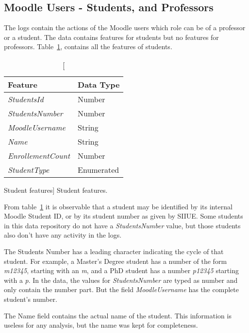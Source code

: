 \subsection{Moodle Users - Students, and Professors}
\label{ref:moodle_users}

The logs contain the actions of the Moodle users which role can be of a
professor or a student. The data contains features for students but no
features for professors. Table~\ref{tab:students_features}, contains all the
features of students.

\begin{table}[h!]
    \centering

    \begin{tabular}{l l}
        Feature                   & Data Type  \\ \hline
        \textit{StudentsId}       & Number     \\
        \textit{StudentsNumber}   & Number     \\
        \textit{MoodleUsername}   & String     \\
        \textit{Name}             & String     \\
        \textit{EnrollementCount} & Number     \\
        \textit{StudentType}      & Enumerated \\
    \end{tabular}

    \caption
        [Student features]
        {Student features.}

    \label{tab:students_features}
\end{table}

From table~\ref{tab:students_features} it is observable that a student may be
identified by its internal Moodle Student ID, or by its student number as
given by SIIUE. Some students in this data repository do not have a
\textit{StudentsNumber} value, but those students also don't have any activity
in the logs.

The Students Number has a leading character indicating the cycle of that
student. For example, a Master's Degree student has a number of the form
\textit{m12345}, starting with an \textit{m}, and a PhD student has a number
\textit{p12345} starting with a \textit{p}. In the data, the values for
\textit{StudentsNumber} are typed as number and only contain the number part.
But the field \textit{MoodleUsername} has the complete student's number.

The Name field contains the actual name of the student. This information is
useless for any analysis, but the name was kept for completeness.

